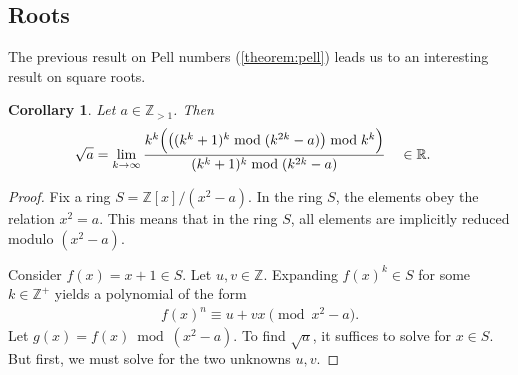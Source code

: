 \documentclass[12pt]{article}
\theoremstyle{plain}
\newtheorem{corollary}[theorem]{Corollary}
\theoremstyle{definition}
\begin{document}
\subsection{Roots}
The previous result on Pell numbers (\cref{theorem:pell}) leads us to an interesting result on square roots.

\begin{corollary} \label{corollary:squareroots}
Let $a \in \mathbb{Z}_{>1}$. Then
\begin{align*}
\sqrt{a} &= \lim_{k\rightarrow\infty}
    \frac{k^k \Bigl( \bigl( (k^k + 1)^k \bmod{(k^{2k}-a)} \bigr) \bmod{k^k} \Bigr)}
        {(k^k + 1)^k \bmod{(k^{2k}-a)}}  \quad \in \mathbb{R} .
\end{align*}
\end{corollary}
\begin{proof}
Fix a ring $S = \mathbb{Z}[x]/(x^2 - a)$. In the ring $S$, the elements obey the relation $x^2 = a$. This means that in the ring $S$, all elements are implicitly reduced modulo $(x^2 - a)$.

Consider $f(x) = x+1 \in S$. Let $u,v \in \mathbb{Z}$. Expanding $f(x)^k \in S$ for some $k \in \mathbb{Z}^+$ yields a polynomial of the form
\begin{align*}
f(x)^n \equiv u + v x \pmod{x^2 - a} .
\end{align*}
Let $g(x) = f(x) \bmod{(x^2-a)}$. To find $\sqrt{a}$, it suffices to solve for $x \in S$. But first, we must solve for the two unknowns $u,v$.


\end{proof}
\end{document}
